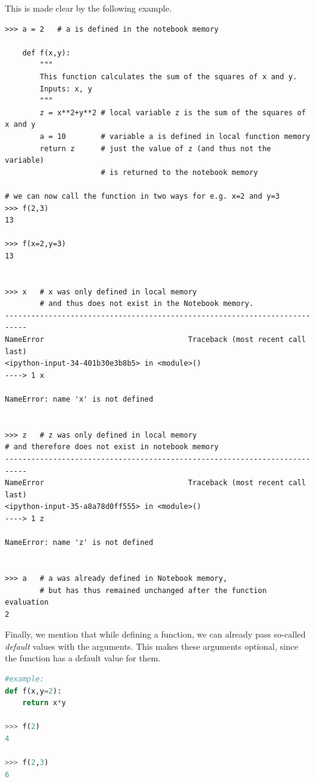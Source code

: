 This is made clear by the following example.
\begin{lstlisting}
>>> a = 2	# a is defined in the notebook memory 

	def f(x,y):
		"""
		This function calculates the sum of the squares of x and y.
		Inputs: x, y
		"""
		z = x**2+y**2 # local variable z is the sum of the squares of x and y
		a = 10        # variable a is defined in local function memory 
		return z      # just the value of z (and thus not the variable)
		              # is returned to the notebook memory
		
# we can now call the function in two ways for e.g. x=2 and y=3
>>> f(2,3)
13

>>> f(x=2,y=3)
13


>>> x	# x was only defined in local memory
        # and thus does not exist in the Notebook memory. 
---------------------------------------------------------------------------
NameError                                 Traceback (most recent call last)
<ipython-input-34-401b30e3b8b5> in <module>()
----> 1 x

NameError: name 'x' is not defined


>>> z	# z was only defined in local memory
# and therefore does not exist in notebook memory 
---------------------------------------------------------------------------
NameError                                 Traceback (most recent call last)
<ipython-input-35-a8a78d0ff555> in <module>()
----> 1 z

NameError: name 'z' is not defined


>>> a	# a was already defined in Notebook memory,
        # but has thus remained unchanged after the function evaluation
2
\end{lstlisting}

Finally, we mention that while defining a function, we can already pass so-called \textit{default} values with the arguments. This makes these arguments optional, since the function has a default value for them.

\begin{lstlisting}[language=Python]
#example:
def f(x,y=2):
	return x*y

>>> f(2)
4

>>> f(2,3)
6
\end{lstlisting}

%
%

